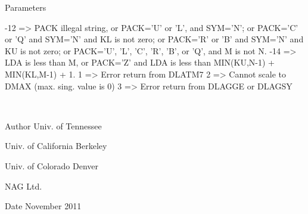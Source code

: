 \begin{DoxyParams}[1]{Parameters}
\begin{DoxyVerb}
           -12 => PACK illegal string, or PACK='U' or 'L', and SYM='N';
                  or PACK='C' or 'Q' and SYM='N' and KL is not zero;
                  or PACK='R' or 'B' and SYM='N' and KU is not zero;
                  or PACK='U', 'L', 'C', 'R', 'B', or 'Q', and M is not
                  N.
           -14 => LDA is less than M, or PACK='Z' and LDA is less than
                  MIN(KU,N-1) + MIN(KL,M-1) + 1.
            1  => Error return from DLATM7
            2  => Cannot scale to DMAX (max. sing. value is 0)
            3  => Error return from DLAGGE or DLAGSY\end{DoxyVerb}
 \\
\hline
\end{DoxyParams}
\begin{DoxyAuthor}{Author}
Univ. of Tennessee 

Univ. of California Berkeley 

Univ. of Colorado Denver 

N\+A\+G Ltd. 
\end{DoxyAuthor}
\begin{DoxyDate}{Date}
November 2011 
\end{DoxyDate}
